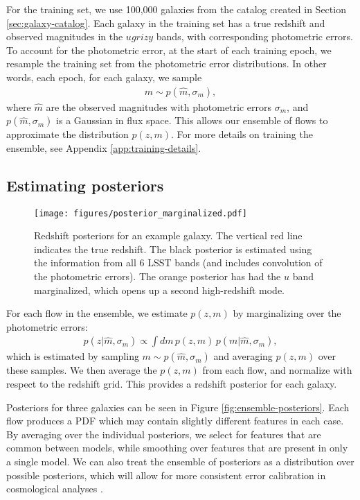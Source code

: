 \documentclass[twocolumn,twocolappendix]{aastex631}
\begin{document}
For the training set, we use 100,000 galaxies from the catalog created in Section \ref{sec:galaxy-catalog}.
Each galaxy in the training set has a true redshift and observed magnitudes in the $ugrizy$ bands, with corresponding photometric errors.
To account for the photometric error, at the start of each training epoch, we resample the training set from the photometric error distributions.
In other words, each epoch, for each galaxy, we sample
\begin{align}
    m \sim p(\hat{m}, \sigma_m),
\end{align}
where $\hat{m}$ are the observed magnitudes with photometric errors $\sigma_m$, and $p(\hat{m}, \sigma_m)$ is a Gaussian in flux space.
This allows our ensemble of flows to approximate the distribution $p(z, m)$.
For more details on training the ensemble, see Appendix \ref{app:training-details}.


\subsection{Estimating posteriors}

\begin{figure}[t]
    \begin{centering}
        \texttt{[image: figures/posterior\_marginalized.pdf]}
        \caption{
            Redshift posteriors for an example galaxy.
            The vertical red line indicates the true redshift.
            The black posterior is estimated using the information from all 6 LSST bands (and includes convolution of the photometric errors).
            The orange posterior has had the $u$ band marginalized, which opens up a second high-redshift mode.
        }
        \label{fig:posterior_marginalized}
    \end{centering}
\end{figure}

For each flow in the ensemble, we estimate $p(z, m)$ by marginalizing over the photometric errors:
\begin{align}
    p(z| \hat{m}, \sigma_m) \propto \int dm \, p(z, m) \, p(m| \hat{m}, \sigma_m),
\end{align}
which is estimated by sampling $m \sim p(\hat{m}, \sigma_m)$ and averaging $p(z, m)$ over these samples.
We then average the $p(z, m)$ from each flow, and normalize with respect to the redshift grid.
This provides a redshift posterior for each galaxy.

Posteriors for three galaxies can be seen in Figure \ref{fig:ensemble-posteriors}.
Each flow produces a PDF which may contain slightly different features in each case.
By averaging over the individual posteriors, we select for features that are common between models, while smoothing over features that are present in only a single model.
We can also treat the ensemble of posteriors as a distribution over possible posteriors, which will allow for more consistent error calibration in cosmological analyses \citep{zhang2023}.
\end{document}
